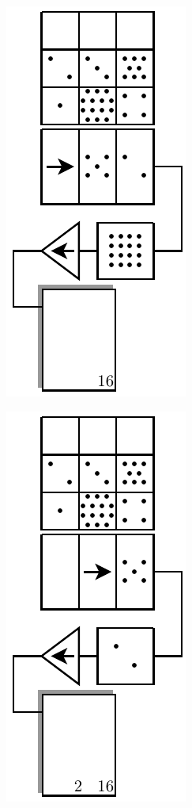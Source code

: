 \begin{figure}[htpb]
\begin{subfigure}[t]{0.5\textwidth}
		\caption{}
	\end{subfigure}
	\begin{subfigure}[t]{0.25\textwidth}
		\centering
		\includegraphics[scale=1.0]{ccd-registry-3.pdf}
		\caption{}
		\label{fig:ccd-registry-3}
	\end{subfigure}%
	\begin{subfigure}[t]{0.25\textwidth}
		\centering
		\includegraphics[scale=1.0]{ccd-registry-4.pdf}

\end{subfigure}
\end{figure}
